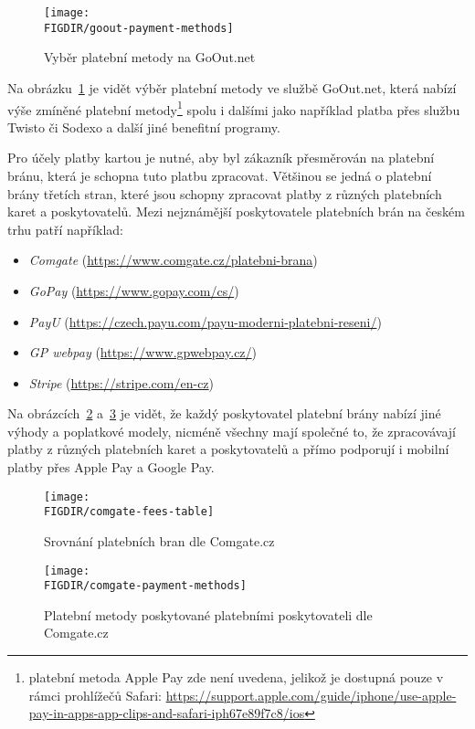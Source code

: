 \begin{figure}[H]
    \texttt{[image: \\FIGDIR/goout-payment-methods]}
    \centering
    \caption{Vyběr platební metody na GoOut.net}
    \label{fig:goout-payment-methods}
\end{figure}

Na obrázku~\ref{fig:goout-payment-methods} je vidět výběr platební metody ve službě GoOut.net, která nabízí výše zmíněné platební metody\footnote{platební metoda Apple Pay zde není uvedena, jelikož je dostupná pouze v rámci prohlížečů Safari: \url{https://support.apple.com/guide/iphone/use-apple-pay-in-apps-app-clips-and-safari-iph67e89f7c8/ios}} spolu i dalšími jako například platba přes službu Twisto či Sodexo a další jiné benefitní programy.

Pro účely platby kartou je nutné, aby byl zákazník přesměrován na platební bránu, která je schopna tuto platbu zpracovat.
Většinou se jedná o platební brány třetích stran, které jsou schopny zpracovat platby z různých platebních karet a poskytovatelů.
Mezi nejznámější poskytovatele platebních brán na českém trhu patří například:

\begin{itemize}
    \item \emph{Comgate} (\url{https://www.comgate.cz/platebni-brana})
    \item \emph{GoPay} (\url{https://www.gopay.com/cs/})
    \item \emph{PayU} (\url{https://czech.payu.com/payu-moderni-platebni-reseni/})
    \item \emph{GP webpay} (\url{https://www.gpwebpay.cz/})
    \item \emph{Stripe} (\url{https://stripe.com/en-cz})
\end{itemize}

Na obrázcích~\ref{fig:comgate-fees-table} a~\ref{fig:comgate-payment-methods} je vidět, že každý poskytovatel platební brány nabízí jiné výhody a poplatkové modely, nicméně všechny mají společné to, že zpracovávají platby z různých platebních karet a poskytovatelů a přímo podporují i mobilní platby přes Apple Pay a Google Pay.

\begin{figure}[H]
    \texttt{[image: \\FIGDIR/comgate-fees-table]}
    \centering
    \caption{Srovnání platebních bran dle Comgate.cz~\cite{comgate_srovnani_platebnich_bran}}
    \label{fig:comgate-fees-table}
\end{figure}

\begin{figure}[H]
    \texttt{[image: \\FIGDIR/comgate-payment-methods]}
    \centering
    \caption{Platební metody poskytované platebními poskytovateli dle Comgate.cz~\cite{comgate_srovnani_platebnich_bran}}
    \label{fig:comgate-payment-methods}
\end{figure}

